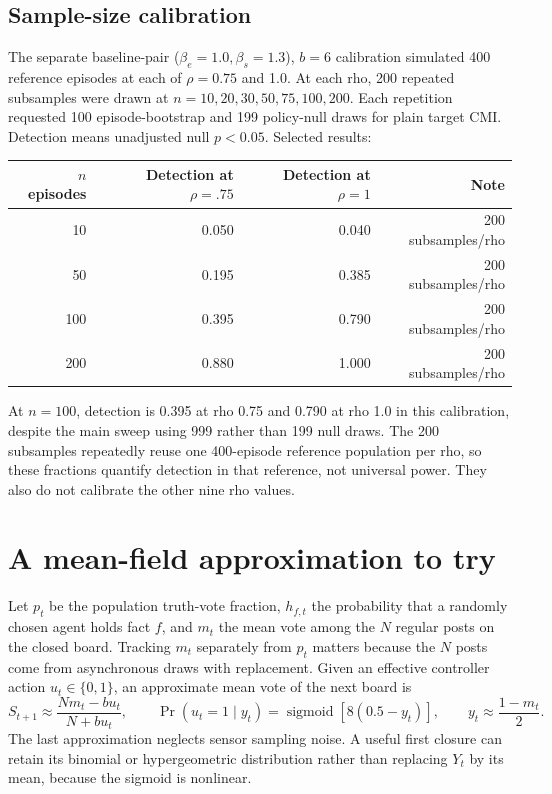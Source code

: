 \documentclass[10pt,a4paper]{article}
\newcommand{\sigm}{\operatorname{sigmoid}}
\begin{document}
\subsection{Sample-size calibration}
The separate baseline-pair ($\beta_e=1.0,\beta_s=1.3$), $b=6$ calibration
simulated 400 reference episodes at each of $\rho=0.75$ and 1.0. At each rho,
200 repeated subsamples were drawn at $n=10,20,30,50,75,100,200$. Each
repetition requested 100 episode-bootstrap and 199 policy-null draws for
plain target CMI. Detection means unadjusted null $p<0.05$. Selected results:
\begin{center}\begin{tabular}{rrrr}\toprule
$n$ episodes & Detection at $\rho=.75$ & Detection at $\rho=1$ & Note\\\midrule
10 & 0.050 & 0.040 & 200 subsamples/rho\\
50 & 0.195 & 0.385 & 200 subsamples/rho\\
100 & 0.395 & 0.790 & 200 subsamples/rho\\
200 & 0.880 & 1.000 & 200 subsamples/rho\\
\bottomrule\end{tabular}\end{center}
At $n=100$, detection is 0.395 at rho 0.75 and 0.790 at rho 1.0 in this
calibration, despite the main sweep using 999 rather than 199 null draws.
The 200 subsamples repeatedly reuse one 400-episode reference population per
rho, so these fractions quantify detection in that reference, not universal
power. They also do not calibrate the other nine rho values.

\section{A mean-field approximation to try}
Let $p_t$ be the population truth-vote fraction, $h_{f,t}$ the probability
that a randomly chosen agent holds fact $f$, and $m_t$ the mean vote among the
$N$ regular posts on the closed board. Tracking $m_t$ separately from $p_t$
matters because the $N$ posts come from asynchronous draws with replacement.
Given an effective controller action $u_t\in\{0,1\}$, an approximate mean
vote of the next board is
\[
S_{t+1}\approx\frac{N m_t-bu_t}{N+bu_t},\qquad
\Pr(u_t=1\mid y_t)=\sigm\!\left[8(0.5-y_t)\right],\qquad
y_t\approx\frac{1-m_t}{2}.
\]
The last approximation neglects sensor sampling noise. A useful first
closure can retain its binomial or hypergeometric distribution rather than
replacing $Y_t$ by its mean, because the sigmoid is nonlinear.
\end{document}
